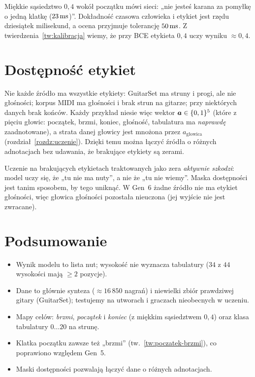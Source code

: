 \begin{intuicja}
Miękkie sąsiedztwo $0{,}4$ wokół początku mówi sieci: „nie jesteś karana za pomyłkę o jedną klatkę ($23\,\mathrm{ms}$)”. Dokładność czasowa człowieka i etykiet jest rzędu dziesiątek milisekund, a ocena przyjmuje tolerancję $50\,\mathrm{ms}$.
Z twierdzenia~\ref{tw:kalibracja} wiemy, że przy BCE etykieta $0{,}4$ uczy wyniku $\approx0{,}4$.
\end{intuicja}

\section{Dostępność etykiet}

Nie każde źródło ma wszystkie etykiety: GuitarSet ma struny i progi, ale nie głośności; korpus MIDI ma głośności i brak strun na gitarze; przy niektórych danych brak końców. Każdy przykład niesie więc wektor
$\bm{a}\in\{0,1\}^5$ (które z pięciu głowic: początek, brzmi, koniec, głośność, tabulatura ma \emph{naprawdę} zaadnotowane), a strata danej głowicy jest mnożona przez $a_\mathrm{głowica}$ (rozdział~\ref{rozdz:uczenie}). Dzięki temu można
łączyć źródła o różnych adnotacjach bez udawania, że brakujące etykiety są zerami.

\begin{pulapka}
Uczenie na brakujących etykietach traktowanych jako zera \emph{aktywnie szkodzi}: model uczy się, że „tu nie ma nuty”, a nie że „tu nie wiemy”. Maska dostępności jest tanim sposobem, by tego uniknąć. W Gen~6 żadne źródło nie ma etykiet głośności, więc głowica głośności pozostała nieuczona (jej wyjście nie jest zwracane).
\end{pulapka}

\section*{Podsumowanie}
\begin{itemize}
\item Wynik modelu to lista nut; wysokość nie wyznacza tabulatury ($34$ z $44$ wysokości mają $\ge2$ pozycje).
\item Dane to głównie synteza ($\approx16\,850$ nagrań) i niewielki zbiór prawdziwej gitary (GuitarSet); testujemy na utworach i graczach nieobecnych w uczeniu.
\item Mapy celów: \emph{brzmi}, \emph{początek} i \emph{koniec} (z miękkim sąsiedztwem $0{,}4$) oraz klasa tabulatury $0\ldots20$ na strunę.
\item Klatka początku zawsze też „brzmi” (tw.~\ref{tw:poczatek-brzmi}), co poprawiono względem Gen~5.
\item Maski dostępności pozwalają łączyć dane o różnych adnotacjach.
\end{itemize}

